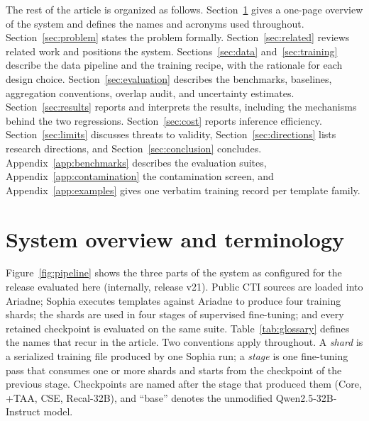 \documentclass[twocolumn]{svjour3}
\begin{document}
The rest of the article is organized as follows. Section~\ref{sec:overview} gives a one-page overview of the system and defines the names and acronyms used throughout. Section~\ref{sec:problem} states the problem formally. Section~\ref{sec:related} reviews related work and positions the system. Sections~\ref{sec:data} and~\ref{sec:training} describe the data pipeline and the training recipe, with the rationale for each design choice. Section~\ref{sec:evaluation} describes the benchmarks, baselines, aggregation conventions, overlap audit, and uncertainty estimates. Section~\ref{sec:results} reports and interprets the results, including the mechanisms behind the two regressions. Section~\ref{sec:cost} reports inference efficiency. Section~\ref{sec:limits} discusses threats to validity, Section~\ref{sec:directions} lists research directions, and Section~\ref{sec:conclusion} concludes. Appendix~\ref{app:benchmarks} describes the evaluation suites, Appendix~\ref{app:contamination} the contamination screen, and Appendix~\ref{app:examples} gives one verbatim training record per template family.

\section{System overview and terminology}\label{sec:overview}
Figure~\ref{fig:pipeline} shows the three parts of the system as configured for the release evaluated here (internally, release v21). Public CTI sources are loaded into Ariadne; Sophia executes templates against Ariadne to produce four training shards; the shards are used in four stages of supervised fine-tuning; and every retained checkpoint is evaluated on the same suite. Table~\ref{tab:glossary} defines the names that recur in the article. Two conventions apply throughout. A \emph{shard} is a serialized training file produced by one Sophia run; a \emph{stage} is one fine-tuning pass that consumes one or more shards and starts from the checkpoint of the previous stage. Checkpoints are named after the stage that produced them (Core, +TAA, CSE, Recal-32B), and ``base'' denotes the unmodified Qwen2.5-32B-Instruct model.
\end{document}
